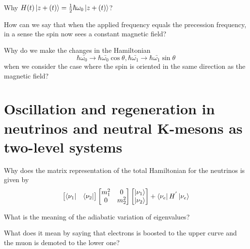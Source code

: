 Why $H(t)\left\lvert z+(t)\right\rangle=\frac{1}{2}\hbar\omega_0\left\lvert z+(t)\right\rangle$?

How can we say that when the applied frequency equals
the precession frequency, in a sense the spin now sees a constant magnetic field?

Why do we make the changes in the Hamiltonian
$$
\hbar \bar{\omega_0}\longrightarrow \hbar\bar{\omega_0}\cos\theta,\hbar\bar{\omega_1}\longrightarrow\hbar\bar{\omega_1}\sin\theta
$$
when we consider the case where the spin is oriented in the same direction as the magnetic field?

\section{Oscillation and regeneration in neutrinos and neutral K-mesons as two-level systems}

Why does the matrix representation of the total Hamiltonian for the neutrinos is given by
$$
\begin{bmatrix}
\left\langle \nu_1 \right\rvert&\left\langle \nu_2 \right\rvert
\end{bmatrix}
\begin{bmatrix}
m_1^2&0\\
0&m_2^2
\end{bmatrix}\begin{bmatrix}
\left\lvert \nu_1\right\rangle\\
\left\lvert \nu_2\right\rangle
\end{bmatrix}+\left\langle \nu_e \right\rvert H^{'}\left\lvert \nu_e\right\rangle
$$

What is the meaning of the adiabatic variation of eigenvalues?

What does it mean by saying that electrons is boosted to the upper curve and the muon is demoted to the lower one?